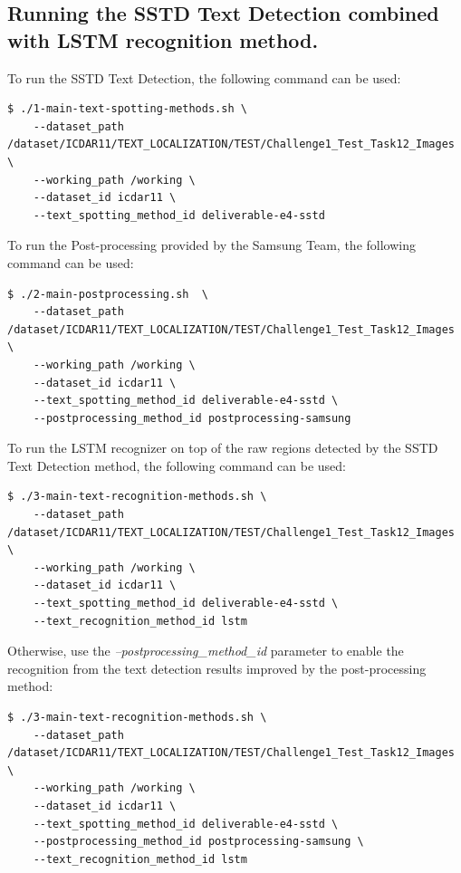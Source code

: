 \subsection{Running the SSTD Text Detection combined with LSTM recognition method.}

To run the SSTD Text Detection, the following command can be used:
\begin{lstlisting}[style=fancyterminal]
 $ ./1-main-text-spotting-methods.sh \ 
    --dataset_path /dataset/ICDAR11/TEXT_LOCALIZATION/TEST/Challenge1_Test_Task12_Images \ 
    --working_path /working \ 
    --dataset_id icdar11 \ 
    --text_spotting_method_id deliverable-e4-sstd
\end{lstlisting}

To run the Post-processing provided by the Samsung Team, the following command can be used:
\begin{lstlisting}[style=fancyterminal]
 $ ./2-main-postprocessing.sh  \ 
    --dataset_path /dataset/ICDAR11/TEXT_LOCALIZATION/TEST/Challenge1_Test_Task12_Images \ 
    --working_path /working \ 
    --dataset_id icdar11 \ 
    --text_spotting_method_id deliverable-e4-sstd \ 
    --postprocessing_method_id postprocessing-samsung
\end{lstlisting}

To run the LSTM recognizer on top of the raw regions detected by the SSTD Text Detection method, the following command can be used:

\begin{lstlisting}[style=fancyterminal]
 $ ./3-main-text-recognition-methods.sh \ 
    --dataset_path /dataset/ICDAR11/TEXT_LOCALIZATION/TEST/Challenge1_Test_Task12_Images \ 
    --working_path /working \ 
    --dataset_id icdar11 \ 
    --text_spotting_method_id deliverable-e4-sstd \ 
    --text_recognition_method_id lstm
\end{lstlisting}

Otherwise, use the \textit{--postprocessing\_method\_id} parameter to enable the recognition from the text detection results improved by the post-processing method:

\begin{lstlisting}[style=fancyterminal]
 $ ./3-main-text-recognition-methods.sh \ 
    --dataset_path /dataset/ICDAR11/TEXT_LOCALIZATION/TEST/Challenge1_Test_Task12_Images \ 
    --working_path /working \ 
    --dataset_id icdar11 \ 
    --text_spotting_method_id deliverable-e4-sstd \ 
    --postprocessing_method_id postprocessing-samsung \ 
    --text_recognition_method_id lstm
\end{lstlisting}


